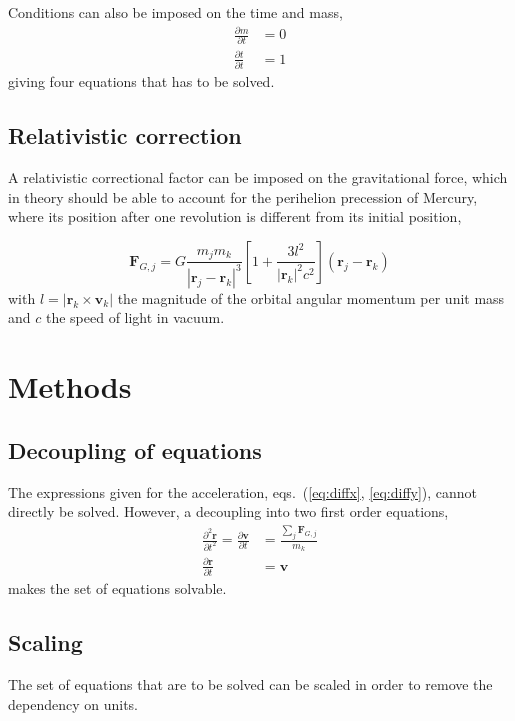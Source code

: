 \documentclass[a4paper,11pt]{article}
\begin{document}
Conditions can also be imposed on the time and mass,
\begin{align}
    \frac{\partial m}{\partial t} &= 0 \label{eq:diffm} \\
    \frac{\partial t}{\partial t} &= 1 \label{eq:difft}
\end{align}
giving four equations that has to be solved. 

\subsection{Relativistic correction}
A relativistic correctional factor can be imposed on the gravitational force, which in theory should be able to account for the perihelion precession of Mercury, where its position after one revolution is different from its initial position,

\begin{equation}
    \mathbf{F}_{G,j} = G\frac{m_j m_k}{| \mathbf{r}_j - \mathbf{r}_k |^3} \left[ 1 + \frac{3l^2}{|\mathbf{r}_k |^2 c^2} \right] \left( \mathbf{r}_j - \mathbf{r}_k \right)
    \label{eq:perihelion}
\end{equation}
with $l = |\mathbf{r}_k \times \mathbf{v}_k|$ the magnitude of the orbital angular momentum per unit mass and $c$ the speed of light in vacuum.


\section{Methods}
\subsection{Decoupling of equations}
The expressions given for the acceleration, eqs.~(\ref{eq:diffx}, \ref{eq:diffy}), cannot directly be solved. However, a decoupling into two first order equations,
\begin{align}
    \frac{\partial^2 \mathbf{r}}{\partial t^2} = \frac{\partial \mathbf{v}}{\partial t} &= \frac{\sum_j \mathbf{F}_{G,j}}{m_k} \label{eq:velocity} \\
    \frac{\partial \mathbf{r}}{\partial t} &= \mathbf{v} \label{eq:position}
\end{align}
makes the set of equations solvable.

\subsection{Scaling}
The set of equations that are to be solved can be scaled in order to remove the dependency on units.
\end{document}
